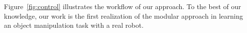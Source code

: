 Figure~\ref{fig:control} illustrates the workflow of our approach. To
the best of our knowledge, our work is the first realization of the
modular approach in learning an object manipulation task with a real
robot.





%
%
%






%



